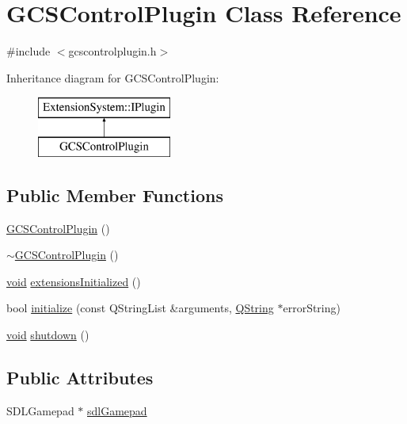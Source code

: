 \hypertarget{class_g_c_s_control_plugin}{\section{\-G\-C\-S\-Control\-Plugin \-Class \-Reference}
\label{class_g_c_s_control_plugin}
}


{\ttfamily \#include $<$gcscontrolplugin.\-h$>$}

\-Inheritance diagram for \-G\-C\-S\-Control\-Plugin\-:\begin{figure}[H]
\begin{center}
\leavevmode
\includegraphics[height=2.000000cm]{class_g_c_s_control_plugin}
\end{center}
\end{figure}
\subsection*{\-Public \-Member \-Functions}
\begin{DoxyCompactItemize}
\item 
\hyperlink{group___g_c_s_control_gadget_plugin_gaa5bf178769d6fdc89db0176db639c02a}{\-G\-C\-S\-Control\-Plugin} ()
\item 
\hyperlink{group___g_c_s_control_gadget_plugin_gaa8f4c5803ed27c6a490522181ad40efa}{$\sim$\-G\-C\-S\-Control\-Plugin} ()
\item 
\hyperlink{group___u_a_v_objects_plugin_ga444cf2ff3f0ecbe028adce838d373f5c}{void} \hyperlink{group___g_c_s_control_gadget_plugin_gad526ae3249e30303394221453d4483a2}{extensions\-Initialized} ()
\item 
bool \hyperlink{group___g_c_s_control_gadget_plugin_ga57b8a6ede4344b5a2e3e9460b158dde8}{initialize} (const \-Q\-String\-List \&arguments, \hyperlink{group___u_a_v_objects_plugin_gab9d252f49c333c94a72f97ce3105a32d}{\-Q\-String} $\ast$error\-String)
\item 
\hyperlink{group___u_a_v_objects_plugin_ga444cf2ff3f0ecbe028adce838d373f5c}{void} \hyperlink{group___g_c_s_control_gadget_plugin_ga4c6e2d64333994bacf7db3c918057799}{shutdown} ()
\end{DoxyCompactItemize}
\subsection*{\-Public \-Attributes}
\begin{DoxyCompactItemize}
\item 
\-S\-D\-L\-Gamepad $\ast$ \hyperlink{group___g_c_s_control_gadget_plugin_ga3cd3b8ed3b17b5405fb2f71803a65951}{sdl\-Gamepad}
\end{DoxyCompactItemize}



